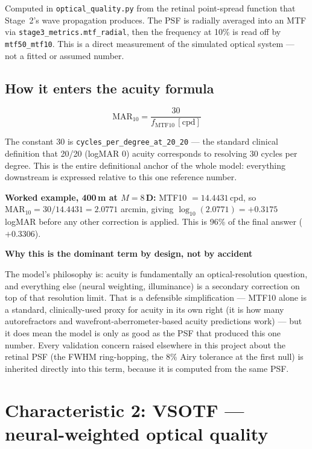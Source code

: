 \documentclass[11pt]{report}
\newenvironment{keybox}[1]%
{\par\vspace{6pt}\begin{lrbox}{\kbsave}\begin{minipage}{0.88\textwidth}%
{\bfseries\color{hbblue}#1}\par\vspace{4pt}\ignorespaces}%
{\end{minipage}\end{lrbox}%
\begin{center}\setlength{\fboxrule}{1.2pt}\setlength{\fboxsep}{7pt}%
\fcolorbox{hbblue}{boxgrey}{\usebox{\kbsave}}\end{center}\vspace{6pt}\par}
\begin{document}
Computed in \texttt{optical\_quality.py} from the retinal point-spread function that Stage~2's wave
propagation produces. The PSF is radially averaged into an MTF via
\texttt{stage3\_metrics.mtf\_radial}, then the frequency at 10\% is read off by
\texttt{mtf50\_mtf10}. This is a direct measurement of the simulated optical system --- not a fitted
or assumed number.

\section{How it enters the acuity formula}

\begin{equation}
\text{MAR}_{10} = \frac{30}{f_{\text{MTF10}}\,[\text{cpd}]}
\end{equation}

The constant 30 is \texttt{cycles\_per\_degree\_at\_20\_20} --- the standard clinical definition that
20/20 (logMAR 0) acuity corresponds to resolving 30 cycles per degree. This is the entire
definitional anchor of the whole model: everything downstream is expressed relative to this one
reference number.

\textbf{Worked example, 400\,\textmu m at $M=8$\,D:} MTF10 $= 14.4431$\,cpd, so
$\text{MAR}_{10} = 30/14.4431 = 2.0771$ arcmin, giving $\log_{10}(2.0771) = +0.3175$ logMAR before any
other correction is applied. This is 96\% of the final answer ($+0.3306$).

\begin{keybox}{Why this is the dominant term by design, not by accident}
The model's philosophy is: acuity is fundamentally an optical-resolution question, and everything
else (neural weighting, illuminance) is a secondary correction on top of that resolution limit. That
is a defensible simplification --- MTF10 alone is a standard, clinically-used proxy for acuity in its
own right (it is how many autorefractors and wavefront-aberrometer-based acuity predictions work) ---
but it does mean the model is only as good as the PSF that produced this one number. Every validation
concern raised elsewhere in this project about the retinal PSF (the FWHM ring-hopping, the 8\% Airy
tolerance at the first null) is inherited directly into this term, because it is computed from the
same PSF.
\end{keybox}

\chapter{Characteristic 2: VSOTF --- neural-weighted optical quality}
\end{document}
